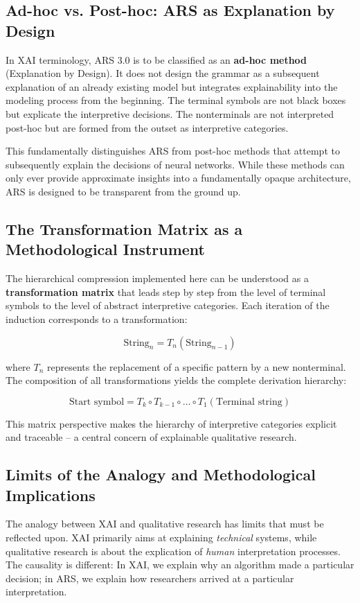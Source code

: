 \documentclass[
  12pt,
  a4paper,
  oneside,
  titlepage
]{article}
\begin{document}
\subsection{Ad-hoc vs. Post-hoc: ARS as Explanation by Design}

In XAI terminology, ARS 3.0 is to be classified as an \textbf{ad-hoc 
method} (Explanation by Design). It does not design the grammar as a 
subsequent explanation of an already existing model but integrates 
explainability into the modeling process from the beginning. The 
terminal symbols are not black boxes but explicate the interpretive 
decisions. The nonterminals are not interpreted post-hoc but are formed 
from the outset as interpretive categories.

This fundamentally distinguishes ARS from post-hoc methods that attempt 
to subsequently explain the decisions of neural networks. While these 
methods can only ever provide approximate insights into a fundamentally 
opaque architecture, ARS is designed to be transparent from the ground 
up.

\subsection{The Transformation Matrix as a Methodological Instrument}

The hierarchical compression implemented here can be understood as a 
\textbf{transformation matrix} that leads step by step from the level 
of terminal symbols to the level of abstract interpretive categories. 
Each iteration of the induction corresponds to a transformation:

\[
\text{String}_n = T_n(\text{String}_{n-1})
\]

where \(T_n\) represents the replacement of a specific pattern by a new 
nonterminal. The composition of all transformations yields the complete 
derivation hierarchy:

\[
\text{Start symbol} = T_k \circ T_{k-1} \circ \ldots \circ T_1(\text{Terminal string})
\]

This matrix perspective makes the hierarchy of interpretive categories 
explicit and traceable – a central concern of explainable qualitative 
research.

\subsection{Limits of the Analogy and Methodological Implications}

The analogy between XAI and qualitative research has limits that must 
be reflected upon. XAI primarily aims at explaining \textit{technical} 
systems, while qualitative research is about the explication of 
\textit{human} interpretation processes. The causality is different: 
In XAI, we explain why an algorithm made a particular decision; in ARS, 
we explain how researchers arrived at a particular interpretation.
\end{document}
